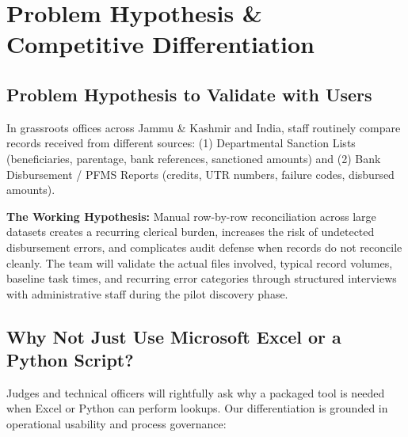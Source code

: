 \documentclass[11pt,a4paper]{article}
\begin{document}
\vspace{0.2cm}

\section{Problem Hypothesis \& Competitive Differentiation}

\subsection{Problem Hypothesis to Validate with Users}
In grassroots offices across Jammu \& Kashmir and India, staff routinely compare records received from different sources: (1) Departmental Sanction Lists (beneficiaries, parentage, bank references, sanctioned amounts) and (2) Bank Disbursement / PFMS Reports (credits, UTR numbers, failure codes, disbursed amounts). 

\textbf{The Working Hypothesis:} Manual row-by-row reconciliation across large datasets creates a recurring clerical burden, increases the risk of undetected disbursement errors, and complicates audit defense when records do not reconcile cleanly. The team will validate the actual files involved, typical record volumes, baseline task times, and recurring error categories through structured interviews with administrative staff during the pilot discovery phase.

\subsection{Why Not Just Use Microsoft Excel or a Python Script?}
Judges and technical officers will rightfully ask why a packaged tool is needed when Excel or Python can perform lookups. Our differentiation is grounded in operational usability and process governance:
\end{document}
